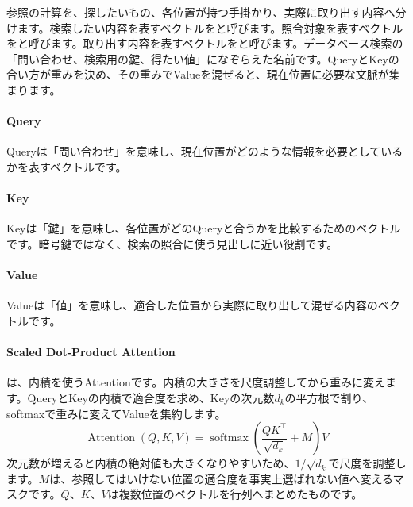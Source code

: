 参照の計算を、探したいもの、各位置が持つ手掛かり、実際に取り出す内容へ分けます。検索したい内容を表すベクトルをと呼びます。照合対象を表すベクトルをと呼びます。取り出す内容を表すベクトルをと呼びます。データベース検索の「問い合わせ、検索用の鍵、得たい値」になぞらえた名前です。QueryとKeyの合い方が重みを決め、その重みでValueを混ぜると、現在位置に必要な文脈が集まります。

\begingroup
\begingroup
\paragraph{Query}
        Queryは「問い合わせ」を意味し、現在位置がどのような情報を必要としているかを表すベクトルです。

\par
\endgroup
\medskip
\begingroup
\paragraph{Key}
        Keyは「鍵」を意味し、各位置がどのQueryと合うかを比較するためのベクトルです。暗号鍵ではなく、検索の照合に使う見出しに近い役割です。

\par
\endgroup
\medskip
\begingroup
\paragraph{Value}
        Valueは「値」を意味し、適合した位置から実際に取り出して混ぜる内容のベクトルです。

\par
\endgroup
  \vspace{5mm}
\paragraph{Scaled Dot-Product Attention}
        は、内積を使うAttentionです。内積の大きさを尺度調整してから重みに変えます。QueryとKeyの内積で適合度を求め、Keyの次元数$d_k$の平方根で割り、softmaxで重みに変えてValueを集約します。
        \[
      \operatorname{Attention}(Q,K,V)
      =\operatorname{softmax}
      \left(\frac{QK^\top}{\sqrt{d_k}}+M\right)V
    \]
    次元数が増えると内積の絶対値も大きくなりやすいため、$1/\sqrt{d_k}$で尺度を調整します。$M$は、参照してはいけない位置の適合度を事実上選ばれない値へ変えるマスクです。$Q$、$K$、$V$は複数位置のベクトルを行列へまとめたものです。

\par
\endgroup


